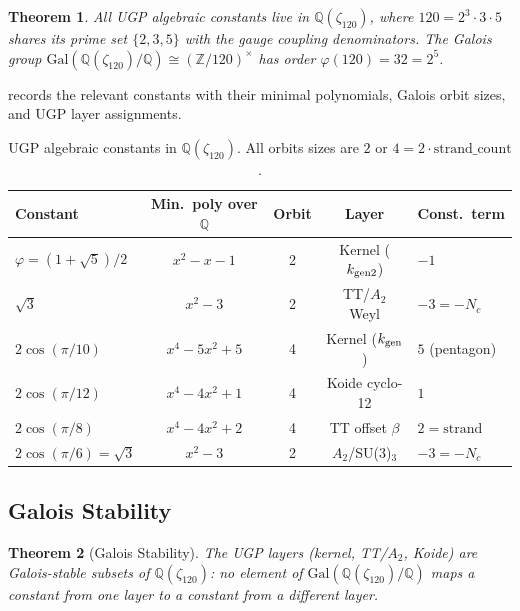 \documentclass[11pt]{article}
\newtheorem{theorem}{Theorem}[section]
\theoremstyle{remark}
\newcommand{\Nc}{N_c}
\newcommand{\zetaN}[1]{\zeta_{#1}}
\newcommand{\PHI}{\varphi}
\begin{document}
\begin{theorem}
\label{thm:cyclotomic}
All UGP algebraic constants live in $\mathbb{Q}(\zetaN{120})$, where
$120 = 2^3 \cdot 3 \cdot 5$ shares its prime set $\{2, 3, 5\}$ with the gauge
coupling denominators.
The Galois group $\mathrm{Gal}(\mathbb{Q}(\zetaN{120})/\mathbb{Q}) \cong (\mathbb{Z}/120)^\times$
has order $\varphi(120) = 32 = 2^5$.
\end{theorem}

 records the relevant constants with their minimal polynomials,
Galois orbit sizes, and UGP layer assignments.

\begin{table}[H]
\centering
\caption{UGP algebraic constants in $\mathbb{Q}(\zetaN{120})$.
  All orbits sizes are $2$ or $4 = 2 \cdot \mathrm{strand\_count}$.}
\label{tab:galois}
\small
\renewcommand{\arraystretch}{1.1}
\begin{tabular}{lcccl}
\toprule
Constant & Min.\ poly over $\mathbb{Q}$ & Orbit & Layer & Const.\ term \\
\midrule
$\PHI = (1+\sqrt{5})/2$ & $x^2 - x - 1$ & 2 & Kernel ($k_{\rm gen2}$) & $-1$ \\
$\sqrt{3}$ & $x^2 - 3$ & 2 & TT/$A_2$ Weyl & $-3 = -\Nc$ \\
$2\cos(\pi/10)$ & $x^4 - 5x^2 + 5$ & 4 & Kernel ($k_{\rm gen}$) & $5$ (pentagon) \\
$2\cos(\pi/12)$ & $x^4 - 4x^2 + 1$ & 4 & Koide cyclo-12 & $1$ \\
$2\cos(\pi/8)$ & $x^4 - 4x^2 + 2$ & 4 & TT offset $\beta$ & $2 = \mathrm{strand}$ \\
$2\cos(\pi/6) = \sqrt{3}$ & $x^2 - 3$ & 2 & $A_2$/SU(3)$_3$ & $-3 = -\Nc$ \\
\bottomrule
\end{tabular}
\end{table}

\subsection{Galois Stability}

\begin{theorem}[Galois Stability]
\label{thm:galois}
The UGP layers (kernel, TT/$A_2$, Koide) are Galois-stable subsets of
$\mathbb{Q}(\zetaN{120})$: no element of
$\mathrm{Gal}(\mathbb{Q}(\zetaN{120})/\mathbb{Q})$ maps a constant from one layer
to a constant from a different layer.
\end{theorem}
\end{document}

